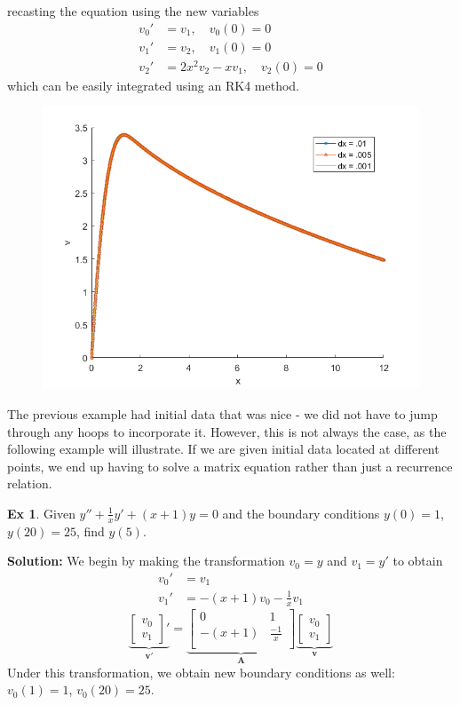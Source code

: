 \documentclass[]{article}
\theoremstyle{definition}
\newtheorem{exmp}{Ex}[section]
\numberwithin{equation}{section}
\begin{document}
recasting the equation using the new variables
\begin{align*}
	v_0' &= v_1, \quad v_0(0) = 0\\
	v_1' &= v_2, \quad v_1(0) = 0\\
	v_2' &= 2x^2v_2 - xv_1, \quad v_2(0) = 0
\end{align*}
which can be easily integrated using an RK4 method.
		\begin{center}
	\begin{figure}[H]
		\centering
		\includegraphics[scale=.7]{ex8_fig.png} 
		\label{fig:system1}
	\end{figure}
\end{center}
 The previous example had initial data that was nice - we did not have to jump through any hoops to incorporate it. However, this is not always the case, as the following example will illustrate. If we are given initial data located at different points, we end up having to solve a matrix equation rather than just a recurrence relation.
\begin{exmp}
	Given $y''+\frac{1}{x}y'+ (x+1)y = 0$ and the boundary conditions $y(0) = 1$, $y(20) = 25$, find $y(5)$.
\end{exmp}
\textbf{Solution:} We begin by making the transformation $v_0 = y$ and $v_1 = y'$ to obtain 
\begin{align*}
	v_0' &= v_1 \\
	v_1' &= -(x+1)v_0 - \frac{1}{x}v_1
\end{align*}
\[
	\underbrace{\begin{bmatrix}
	v_0 \\
	v_1
	\end{bmatrix}'}_{\mathbf{v'}} = \underbrace{\begin{bmatrix}
	0 & 1 \\
	-(x+1) & \frac{-1}{x} \\
	\end{bmatrix}}_{\mathbf{A}} \underbrace{\begin{bmatrix}
	v_0 \\
	v_1 
	\end{bmatrix}}_{\mathbf{v}}
\]
Under this transformation, we obtain new boundary conditions as well: $v_0(1) = 1$, $v_0(20)=25$. 
\end{document}
